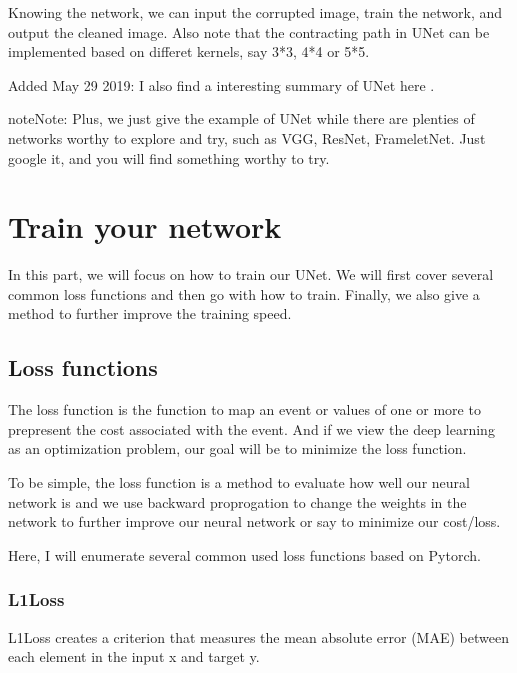 \documentclass[letterpaper,10pt,english]{sphinxmanual}
\begin{document}
Knowing the network, we can input the corrupted image, train the network, and output the cleaned image. Also note that the contracting path in UNet can be implemented based on differet kernels, say 3*3, 4*4 or 5*5.

Added May 29 2019: I also find a interesting summary of UNet here  .

\begin{sphinxadmonition}{note}{Note:}
Plus, we just give the example of UNet while there are plenties of networks worthy to explore and try, such as VGG, ResNet, FrameletNet. Just google it, and you will find something worthy to try.
\end{sphinxadmonition}


\section{Train your network}
\label{\detokenize{usage/train:train-your-network}}\label{\detokenize{usage/train::doc}}
In this part, we will focus on how to train our UNet. We will first cover several common loss functions and then go with how to train. Finally, we also give a method to further improve the training speed.


\subsection{Loss functions}
\label{\detokenize{usage/train:loss-functions}}
The loss function is the function to map an event or values of one or more to prepresent the cost associated with the event. And if we view the deep learning as an optimization problem, our goal will be to minimize the loss function.

To be simple, the loss function is a method to evaluate how well our neural network is and we use backward proprogation to change the weights in the network to further improve our neural network or say to minimize our cost/loss.

Here, I will enumerate several common used loss functions based on Pytorch.


\subsubsection{L1Loss}
\label{\detokenize{usage/train:l1loss}}
L1Loss creates a criterion that measures the mean absolute error (MAE) between each element in the input x and target y.
\end{document}
